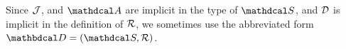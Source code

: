 \documentclass{article}
\begin{document}
\begin{defn}




	\smallskip
	Since $\mathcal J$, and $\Attrs$ are implicit in the type of $\sch$, and ${\mathcal D}$ is implicit in the definition of ${\mathcal R}$,
	we sometimes use the abbreviated form $\D = (\sch, \Rels)$. %
\end{defn}
\medskip

\end{document}
